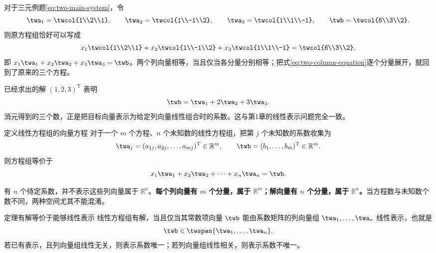 \documentclass[a4paper,12pt,twoside,openany,fontset=none]{ctexbook}
\newcounter{theorem}[chapter]
\newenvironment{theorem}[1][]{\begin{thmBox}{定理}{#1}}{\end{thmBox}}
\newcounter{definition}[chapter]
\newenvironment{definition}[1][]{\begin{defBox}{定义}{#1}}{\end{defBox}}
\numberwithin{equation}{chapter}
\begin{document}
对于三元例题\eqref{eq:two-main-system}，令
\[
    \twa_1=\twcol{1\\2\\1},\qquad
    \twa_2=\twcol{1\\-1\\2},\qquad
    \twa_3=\twcol{1\\1\\-1},\qquad
    \twb=\twcol{6\\3\\2}.
\]
则原方程组恰好可以写成
\begin{equation}
\label{eq:two-column-equation}
    x_1\twcol{1\\2\\1}
    +x_2\twcol{1\\-1\\2}
    +x_3\twcol{1\\1\\-1}
    =\twcol{6\\3\\2},
\end{equation}
即 $x_1\twa_1+x_2\twa_2+x_3\twa_3=\twb$。两个列向量相等，当且仅当各分量分别相等；把式\eqref{eq:two-column-equation}逐个分量展开，就回到了原来的三个方程。

已经求出的解 $(1,2,3)^{\mathrm T}$ 表明
\[
    \twb=\twa_1+2\twa_2+3\twa_3.
\]
消元得到的三个数，正是把目标向量表示为给定列向量线性组合时的系数。这与第1章的线性表示问题完全一致。

\begin{definition}[线性方程组的向量方程]
对于一个 $m$ 个方程、$n$ 个未知数的线性方程组，把第 $j$ 个未知数的系数收集为
\[
    \twa_j=(a_{1j},a_{2j},\ldots,a_{mj})^{\mathrm T}\in\mathbb R^m,
    \qquad \twb=(b_1,\ldots,b_m)^{\mathrm T}\in\mathbb R^m.
\]
则方程组等价于\textbf{}
\[
    x_1\twa_1+x_2\twa_2+\cdots+x_n\twa_n=\twb.
\]
\end{definition}

有 $n$ 个待定系数，并不表示这些列向量属于 $\mathbb R^n$。\textbf{每个列向量有 $m$ 个分量，属于 $\mathbb R^m$；解向量有 $n$ 个分量，属于 $\mathbb R^n$。}当方程数与未知数个数不同，两种空间尤其不能混淆。

\begin{theorem}[有解等价于能够线性表示]
线性方程组有解，当且仅当其常数项向量 $\twb$ 能由系数矩阵的列向量组 $\twa_1,\ldots,\twa_n$ 线性表示，也就是
\[
    \twb\in\twspan\{\twa_1,\ldots,\twa_n\}.
\]
若已有表示，且列向量组线性无关，则表示系数唯一；若列向量组线性相关，则表示系数不唯一。
\end{theorem}
\end{document}

